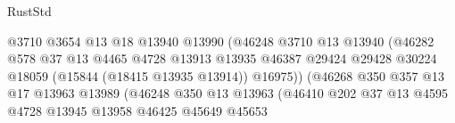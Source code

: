 \begin{lexlean}{RustStd}
\begin{coremodule}
                                              @3710
                                              @3654
                                              @13
                                              @18
                                              @13940
                                              @13990
                                              (@46248
                                                @3710
                                                @13
                                                @13940
                                                (@46282
                                                  @578
                                                  @37
                                                  @13
                                                  @4465
                                                  @4728
                                                  @13913
                                                  @13935
                                                  @46387
                                                  @29424
                                                  @29428
                                                  @30224
                                                  @18059
                                                  (@15844 (@18415 @13935 @13914))
                                                  @16975))
                                              (@46268
                                                @350
                                                @357
                                                @13
                                                @17
                                                @13963
                                                @13989
                                                (@46248
                                                  @350
                                                  @13
                                                  @13963
                                                  (@46410
                                                    @202
                                                    @37
                                                    @13
                                                    @4595
                                                    @4728
                                                    @13945
                                                    @13958
                                                    @46425
                                                    @45649
                                                    @45653

\end{coremodule}
\end{lexlean}
